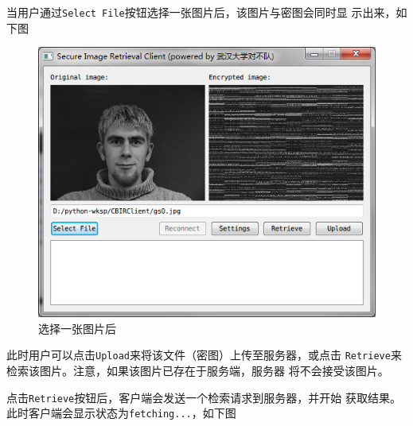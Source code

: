 当用户通过\texttt{Select File}按钮选择一张图片后，该图片与密图会同时显
示出来，如下图

\begin{figure}[H]
  \centering
  \includegraphics[keepaspectratio=true]{images/ui-image-selected.png}
  \caption{选择一张图片后}
  \label{fig:ui-image-selected}
\end{figure}

此时用户可以点击\texttt{Upload}来将该文件（密图）上传至服务器，或点击
\texttt{Retrieve}来检索该图片。注意，如果该图片已存在于服务端，服务器
将不会接受该图片。

点击\texttt{Retrieve}按钮后，客户端会发送一个检索请求到服务器，并开始
获取结果。此时客户端会显示状态为\texttt{fetching...}，如下图

